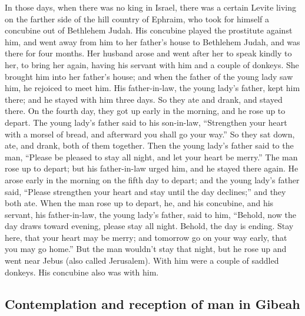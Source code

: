  In those days, when there was no king in Israel, there
was a certain Levite living on the farther side of the hill country of
Ephraim, who took for himself a concubine out of Bethlehem Judah.
 His concubine played the prostitute against him, and went
away from him to her father's house to Bethlehem Judah, and was there
for four months.  Her husband arose and went after her to
speak kindly to her, to bring her again, having his servant with him and
a couple of donkeys. She brought him into her father's house; and when
the father of the young lady saw him, he rejoiced to meet him.
 His father-in-law, the young lady's father, kept him
there; and he stayed with him three days. So they ate and drank, and
stayed there.  On the fourth day, they got up early in the
morning, and he rose up to depart. The young lady's father said to his
son-in-law, ``Strengthen your heart with a morsel of bread, and
afterward you shall go your way.''  So they sat down, ate,
and drank, both of them together. Then the young lady's father said to
the man, ``Please be pleased to stay all night, and let your heart be
merry.''  The man rose up to depart; but his father-in-law
urged him, and he stayed there again.  He arose early in
the morning on the fifth day to depart; and the young lady's father
said, ``Please strengthen your heart and stay until the day declines;''
and they both ate.  When the man rose up to depart, he,
and his concubine, and his servant, his father-in-law, the young lady's
father, said to him, ``Behold, now the day draws toward evening, please
stay all night. Behold, the day is ending. Stay here, that your heart
may be merry; and tomorrow go on your way early, that you may go home.''
 But the man wouldn't stay that night, but he rose up and
went near Jebus (also called Jerusalem). With him were a couple of
saddled donkeys. His concubine also was with him.

\hypertarget{contemplation-and-reception-of-man-in-gibeah}{%
\subsection{Contemplation and reception of man in
Gibeah}\label{contemplation-and-reception-of-man-in-gibeah}}

